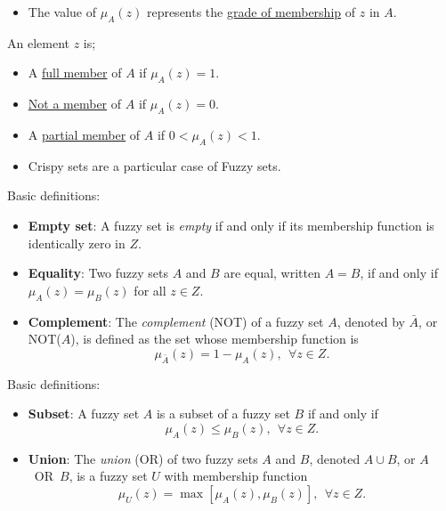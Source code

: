 \begin{frame}
\begin{itemize}
\item The value of $\mu_{A}(z)$ represents the \underline{grade of membership} of $z$ in $A$.
\end{itemize}
An element $z$ is;
\begin{itemize}
\item A \underline{full member} of $A$ if $\mu_{A}(z)=1$.
\item \underline{Not a member} of $A$ if $\mu_{A}(z)=0$.
\item A \underline{partial member} of $A$ if $0<\mu_{A}(z)<1$.
\end{itemize}
\begin{itemize}
\item Crispy sets are a particular case of Fuzzy sets.
\end{itemize}
\end{frame}


\begin{frame}
Basic definitions:
\begin{itemize}
\item \textbf{Empty set}: A fuzzy set is \textit{empty} if and only if its membership function is identically zero in $Z$.
\item \textbf{Equality}: Two fuzzy sets $A$ and $B$ are equal, written $A = B$, if and only if $\mu_{A} (z) = \mu_{B}(z)$ for all $z \in Z$.
\item \textbf{Complement}: The \textit{complement} (NOT) of a fuzzy set $A$, denoted by $\bar{A}$, or NOT($A$), is defined as the set whose membership function is
\[
\mu_{\bar{A}}(z) = 1 - \mu_{A}(z),\ \ \forall z \in Z.
\]
\end{itemize}
\end{frame}


\begin{frame}
Basic definitions:
\begin{itemize}
\item \textbf{Subset}: A fuzzy set $A$ is a subset of a fuzzy set $B$ if and only if
\[
\mu_{A} (z) \leq \mu_{B}(z),\ \ \forall z \in Z.
\]
\item \textbf{Union}: The \textit{union} (OR) of two fuzzy sets $A$ and $B$, denoted $A \cup B$, or $A$~OR~$B$, is a fuzzy set $U$ with membership function
\[
\mu_{U}(z) = \max \left [ \mu_{A}(z), \mu_{B}(z) \right ],\ \ \forall z \in Z.
\]
\end{itemize}
\end{frame}

